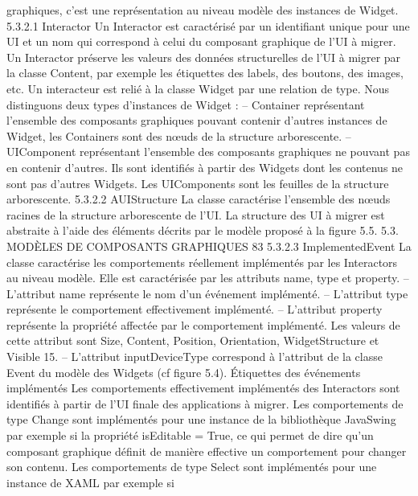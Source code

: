 \documentclass{article}
\begin{document}
graphiques, c’est une repr\'{e}sentation au niveau mod\`{e}le des instances de Widget.
5.3.2.1
Interactor
Un Interactor est caract\'{e}ris\'{e} par un identiﬁant unique pour une UI et un nom qui correspond
\`{a} celui du composant graphique de l’UI \`{a} migrer. Un Interactor pr\'{e}serve les valeurs des donn\'{e}es
structurelles de l’UI \`{a} migrer par la classe Content, par exemple les \'{e}tiquettes des labels, des boutons,
des images, etc. Un interacteur est reli\'{e} \`{a} la classe Widget par une relation de type. Nous distinguons
deux types d’instances de Widget :
– Container repr\'{e}sentant l’ensemble des composants graphiques pouvant contenir d’autres instances de Widget, les Containers sont des nœuds de la structure arborescente.
– UIComponent repr\'{e}sentant l’ensemble des composants graphiques ne pouvant pas en contenir
d’autres. Ils sont identiﬁ\'{e}s \`{a} partir des Widgets dont les contenus ne sont pas d’autres Widgets.
Les UIComponents sont les feuilles de la structure arborescente.
5.3.2.2
AUIStructure
La classe caract\'{e}rise l’ensemble des nœuds racines de la structure arborescente de l’UI. La structure des UI \`{a} migrer est abstraite \`{a} l’aide des \'{e}l\'{e}ments d\'{e}crits par le mod\`{e}le propos\'{e} \`{a} la ﬁgure 5.5.
5.3. MODÈLES DE COMPOSANTS GRAPHIQUES
83
5.3.2.3
ImplementedEvent
La classe caract\'{e}rise les comportements r\'{e}ellement impl\'{e}ment\'{e}s par les Interactors au niveau
mod\`{e}le. Elle est caract\'{e}ris\'{e}e par les attributs name, type et property.
– L’attribut name repr\'{e}sente le nom d’un \'{e}v\'{e}nement impl\'{e}ment\'{e}.
– L’attribut type repr\'{e}sente le comportement effectivement impl\'{e}ment\'{e}.
– L’attribut property repr\'{e}sente la propri\'{e}t\'{e} affect\'{e}e par le comportement impl\'{e}ment\'{e}. Les valeurs
de cette attribut sont Size, Content, Position, Orientation, WidgetStructure et Visible 15.
– L’attribut inputDeviceType correspond \`{a} l’attribut de la classe Event du mod\`{e}le des Widgets (cf
ﬁgure 5.4).
Étiquettes des \'{e}v\'{e}nements impl\'{e}ment\'{e}s
Les comportements effectivement impl\'{e}ment\'{e}s des Interactors sont identiﬁ\'{e}s \`{a} partir de l’UI ﬁnale des applications \`{a} migrer.
Les comportements de type Change sont impl\'{e}ment\'{e}s pour une instance de la biblioth\`{e}que JavaSwing par exemple si la propri\'{e}t\'{e} isEditable = True, ce qui permet de dire qu’un composant graphique
d\'{e}ﬁnit de mani\`{e}re effective un comportement pour changer son contenu.
Les comportements de type Select sont impl\'{e}ment\'{e}s pour une instance de XAML par exemple si
\end{document}
